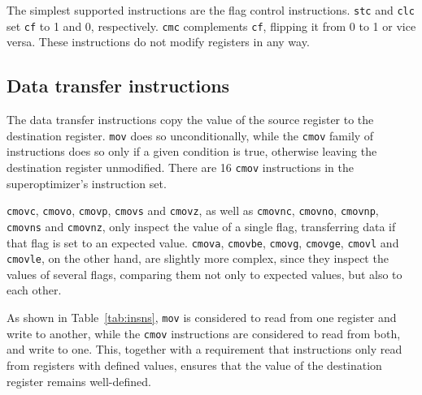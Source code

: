 \documentclass[a4paper,11pt]{kth-mag}
\begin{document}
The simplest supported instructions are the flag control instructions.
\verb|stc| and \verb|clc| set \verb|cf| to 1 and 0, respectively.
\verb|cmc| complements \verb|cf|, flipping it from 0 to 1 or vice versa.
These instructions do not modify registers in any way.

\subsection{Data transfer instructions}

The data transfer instructions copy the value of the source register to the destination register.
\verb|mov| does so unconditionally, while the \verb|cmov| family of instructions does so only if a given condition is true, otherwise leaving the destination register unmodified.
There are 16 \verb|cmov| instructions in the superoptimizer's instruction set.

\verb|cmovc|, \verb|cmovo|, \verb|cmovp|, \verb|cmovs| and \verb|cmovz|, as well as \verb|cmovnc|, \verb|cmovno|, \verb|cmovnp|, \verb|cmovns| and \verb|cmovnz|, only inspect the value of a single flag, transferring data if that flag is set to an expected value.
\verb|cmova|, \verb|cmovbe|, \verb|cmovg|, \verb|cmovge|, \verb|cmovl| and \verb|cmovle|, on the other hand, are slightly more complex, since they inspect the values of several flags, comparing them not only to expected values, but also to each other.



As shown in Table~\ref{tab:insns}, \verb|mov| is considered to read from one register and write to another, while the \verb|cmov| instructions are considered to read from both, and write to one.
This, together with a requirement that instructions only read from registers with defined values, ensures that the value of the destination register remains well-defined.
\end{document}
